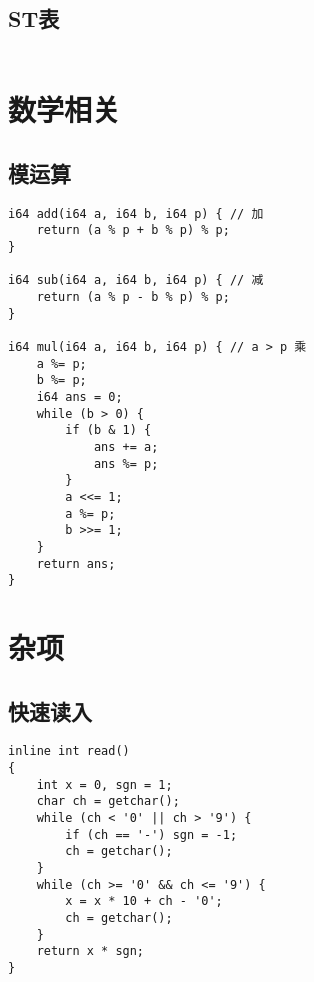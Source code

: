 \documentclass[a4paper, 10pt]{paper}
\newcommand{\cpp}[1]{\inputminted[frame=single, linenos=true]{cpp}{#1}}
\begin{document}
        \subsection{ST表}
        \cpp{../ST.cpp}

    \section{数学相关}
        \subsection{模运算}
        \begin{verbatim}
i64 add(i64 a, i64 b, i64 p) { // 加
    return (a % p + b % p) % p;
}

i64 sub(i64 a, i64 b, i64 p) { // 减
    return (a % p - b % p) % p;
}

i64 mul(i64 a, i64 b, i64 p) { // a > p 乘
    a %= p;
    b %= p;
    i64 ans = 0;
    while (b > 0) {
        if (b & 1) {
            ans += a;
            ans %= p;
        }
        a <<= 1;
        a %= p;
        b >>= 1;
    }
    return ans;
}
        \end{verbatim}

    \section{杂项}
        \subsection{快速读入}
        \begin{verbatim}
inline int read()
{
    int x = 0, sgn = 1;
    char ch = getchar();
    while (ch < '0' || ch > '9') {
        if (ch == '-') sgn = -1;
        ch = getchar();
    }
    while (ch >= '0' && ch <= '9') {
        x = x * 10 + ch - '0';
        ch = getchar();
    }
    return x * sgn;
}
        \end{verbatim}
\end{document}
